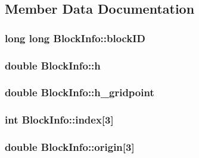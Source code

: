 \subsection{Member Data Documentation}
\hypertarget{struct_block_info_aff4a50657c14cc550c9e0e3aaaed1a15}{}
\subsubsection[{block\+I\+D}]{\setlength{\rightskip}{0pt plus 5cm}long long Block\+Info\+::block\+I\+D}\label{struct_block_info_aff4a50657c14cc550c9e0e3aaaed1a15}
\hypertarget{struct_block_info_abb250cd39311bd0a840588ff2a6196ad}{}
\subsubsection[{h}]{\setlength{\rightskip}{0pt plus 5cm}double Block\+Info\+::h}\label{struct_block_info_abb250cd39311bd0a840588ff2a6196ad}
\hypertarget{struct_block_info_a83bd46701539e64d666206d6501ee3ea}{}
\subsubsection[{h\+\_\+gridpoint}]{\setlength{\rightskip}{0pt plus 5cm}double Block\+Info\+::h\+\_\+gridpoint}\label{struct_block_info_a83bd46701539e64d666206d6501ee3ea}
\hypertarget{struct_block_info_ad32832aaa2dee35464a74abfae741572}{}
\subsubsection[{index}]{\setlength{\rightskip}{0pt plus 5cm}int Block\+Info\+::index\mbox{[}3\mbox{]}}\label{struct_block_info_ad32832aaa2dee35464a74abfae741572}
\hypertarget{struct_block_info_a8d2d03097cfbffc58d3cc2dee371e4b2}{}
\subsubsection[{origin}]{\setlength{\rightskip}{0pt plus 5cm}double Block\+Info\+::origin\mbox{[}3\mbox{]}}\label{struct_block_info_a8d2d03097cfbffc58d3cc2dee371e4b2}
\hypertarget{struct_block_info_af3655416c17becfb24a9f475a7b97d23}{}
